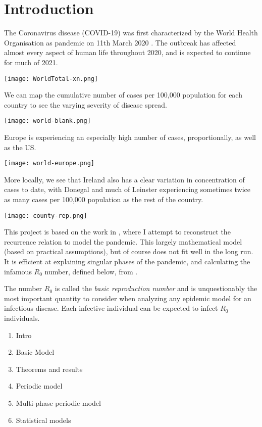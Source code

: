 \section{Introduction}
\label{ch:intro}

The Coronavirus disease (COVID-19) was first characterized by the World Health Organisation as pandemic on 11th March 2020 \cite{whodeclare20}. The outbreak has affected almost every aspect of human life throughout 2020, and is expected to continue for much of 2021. 

\texttt{[image: WorldTotal-xn.png]}

We can map the cumulative number of cases per 100,000 population for each country to see the varying severity of disease spread. 

\texttt{[image: world-blank.png]}

Europe is experiencing an especially high number of cases, proportionally, as well as the US.

\texttt{[image: world-europe.png]}

More locally, we see that Ireland also has a clear variation in concentration of cases to date, with Donegal and much of Leinster experiencing sometimes twice as many cases per 100,000 population as the rest of the country.

\texttt{[image: county-rep.png]}


This project is based on the work in \cite{grigor20}, where I attempt to  reconstruct the recurrence relation to model the pandemic. This largely mathematical model (based on practical assumptions), but of course does not fit well in the long run. It is efficient at explaining singular phases of the pandemic, and calculating the infamous $R_0$ number, defined below, from \cite{epid08}. 

\begin{ndefinition} 
The number $R_0$ is called
the \textit{basic reproduction number} and is unquestionably the most important quantity to consider when analyzing any epidemic model for an infectious disease. Each infective individual can be expected to infect $R_0$ individuals. 
\end{ndefinition}

\begin{enumerate}
    \item Intro
    \item Basic Model
    \item Theorems and results
    \item Periodic model 
    \item Multi-phase periodic model
    \item Statistical models
\end{enumerate}